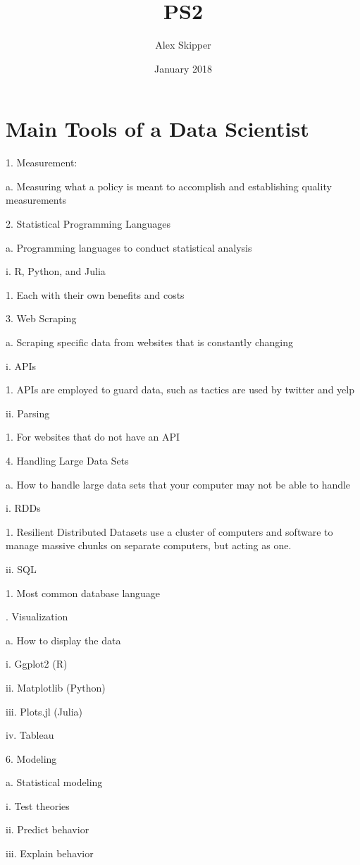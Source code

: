 \documentclass{article}
\title{PS2}
\author{Alex Skipper }
\date{January 2018}
\begin{document}
\maketitle
\section{Main Tools of a Data Scientist}
1.	Measurement:

a.	Measuring what a policy is meant to accomplish and establishing quality measurements 



2.	Statistical Programming Languages 

a.	Programming languages to conduct statistical analysis

i.	R, Python, and Julia

1.	Each with their own benefits and costs 



3.	Web Scraping 

a.	 Scraping specific data from websites that is constantly changing

i.	APIs

1.	APIs are employed to guard data, such as tactics are used by twitter and yelp

ii.	Parsing 

1.	For websites that do not have an API


4.	Handling Large Data Sets 

a.	How to handle large data sets that your computer may not be able to handle 

i.	RDDs 

1.	Resilient Distributed Datasets use a cluster of computers and software to manage massive chunks on separate computers, but acting as one.

ii.	SQL

1.	Most common database language 


.	Visualization 

a.	How to display the data 

i.	Ggplot2 (R)

ii.	Matplotlib (Python)

iii.	Plots.jl (Julia)

iv.	Tableau 



6.	Modeling

a.	Statistical modeling 

i.	Test theories 

ii.	Predict behavior 

iii.	Explain behavior 
\end{document}
